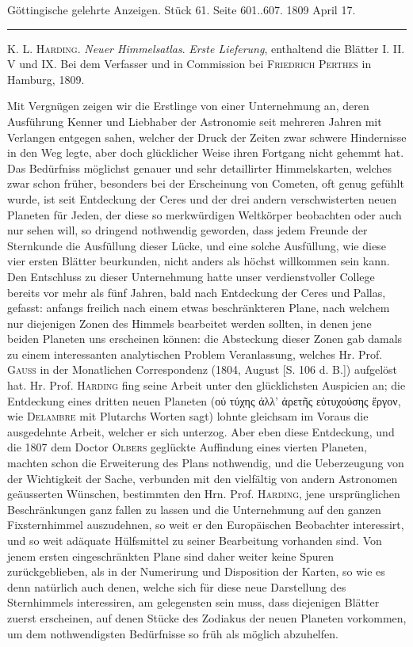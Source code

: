 \clearpage
{}
\begin{center}\small Göttingische gelehrte Anzeigen. Stück 61. Seite 601..607. 1809 April 17.\\[3pt]\rule{.72\linewidth}{.3pt}\end{center}

\textsc{K. L. Harding}. \emph{Neuer Himmelsatlas}. \emph{Erste Lieferung}, enthaltend die Blätter I. II. V und IX. Bei dem Verfasser und in Commission bei \textsc{Friedrich Perthes} in Hamburg, 1809.

Mit Vergnügen zeigen wir die Erstlinge von einer Unternehmung an, deren Ausführung Kenner und Liebhaber der Astronomie seit mehreren Jahren mit Verlangen entgegen sahen, welcher der Druck der Zeiten zwar schwere Hindernisse in den Weg legte, aber doch glücklicher Weise ihren Fortgang nicht gehemmt hat. Das Bedürfniss möglichst genauer und sehr detaillirter Himmelskarten, welches zwar schon früher, besonders bei der Erscheinung von Cometen, oft genug gefühlt wurde, ist seit Entdeckung der Ceres und der drei andern verschwisterten neuen Planeten für Jeden, der diese so merkwürdigen Weltkörper beobachten oder auch nur sehen will, so dringend nothwendig geworden, dass jedem Freunde der Sternkunde die Ausfüllung dieser Lücke, und eine solche Ausfüllung, wie diese vier ersten Blätter beurkunden, nicht anders als höchst willkommen sein kann. Den Entschluss zu dieser Unternehmung hatte unser verdienstvoller College bereits vor mehr als fünf Jahren, bald nach Entdeckung der Ceres und Pallas, gefasst: anfangs freilich nach einem etwas beschränkteren Plane, nach welchem nur diejenigen Zonen des Himmels bearbeitet werden sollten, in denen jene beiden Planeten uns erscheinen können: die Absteckung dieser Zonen gab damals zu einem interessanten analytischen Problem Veranlassung, welches Hr. Prof. \textsc{Gauss} in der Monatlichen Correspondenz (1804, August [S. 106 d. B.]) aufgelöst hat. Hr. Prof. \textsc{Harding} fing seine Arbeit unter den glücklichsten Auspicien an; die Entdeckung eines dritten neuen Planeten ({\LatitudeSymbols οὐ τύχης ἀλλ' ἀρετῆς εὐτυχούσης ἔργον}, wie \textsc{Delambre} mit Plutarchs Worten sagt) lohnte gleichsam im Voraus die ausgedehnte Arbeit, welcher er sich unterzog. Aber eben diese Entdeckung, und die 1807 dem Doctor \textsc{Olbers} geglückte Auffindung eines vierten Planeten, machten schon die Erweiterung des Plans nothwendig, und die Ueberzeugung von der Wichtigkeit der Sache, verbunden mit den vielfältig von andern Astronomen geäusserten Wünschen, bestimmten den Hrn. Prof. \textsc{Harding}, jene ursprünglichen Beschränkungen ganz fallen zu lassen und die Unternehmung auf den ganzen Fixsternhimmel auszudehnen, so weit er den Europäischen Beobachter interessirt, und so weit adäquate Hülfsmittel zu seiner Bearbeitung vorhanden sind. Von jenem ersten eingeschränkten Plane sind daher weiter keine Spuren zurückgeblieben, als in der Numerirung und Disposition der Karten, so wie es denn natürlich auch denen, welche sich für diese neue Darstellung des Sternhimmels interessiren, am gelegensten sein muss, dass diejenigen Blätter zuerst erscheinen, auf denen Stücke des Zodiakus der neuen Planeten vorkommen, um dem nothwendigsten Bedürfnisse so früh als möglich abzuhelfen.

